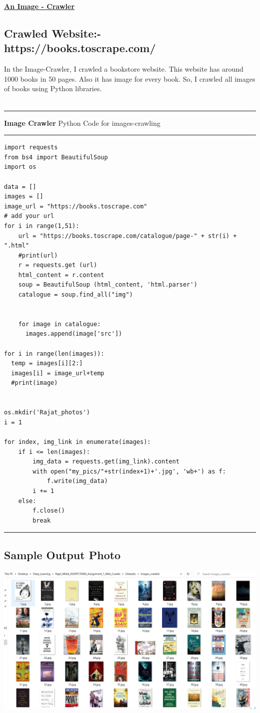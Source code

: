 \documentclass[11pt]{article}
\begin{document}
\pagebreak
\centerline{\uline{\Large{\textbf{An Image - Crawler}}}}
\subsection*{Crawled Website:- https://books.toscrape.com/}

\hspace{1in}In the Image-Crawler, I crawled a bookstore website. This website has around 1000 books in 50 pages. Also it has image for every book. So, I crawled all images of books using Python libraries.
\\

 \\
\rule{\textwidth}{0.4pt}
\textbf{Image Crawler} Python Code for images-crawling\\
\rule{\textwidth}{0.4pt}
\begin{lstlisting}
import requests
from bs4 import BeautifulSoup
import os

data = []
images = []
image_url = "https://books.toscrape.com"
# add your url
for i in range(1,51):
    url = "https://books.toscrape.com/catalogue/page-" + str(i) + ".html"
    #print(url)
    r = requests.get (url)
    html_content = r.content
    soup = BeautifulSoup (html_content, 'html.parser')
    catalogue = soup.find_all("img")
    
    
    for image in catalogue:
      images.append(image['src'])

for i in range(len(images)):
  temp = images[i][2:]
  images[i] = image_url+temp
  #print(image)


os.mkdir('Rajat_photos')
i = 1

for index, img_link in enumerate(images):
    if i <= len(images):
        img_data = requests.get(img_link).content
        with open("my_pics/"+str(index+1)+'.jpg', 'wb+') as f:
            f.write(img_data)
        i += 1
    else:
        f.close()
        break

\end{lstlisting}
\rule{\textwidth}{0.4pt}

\subsection*{Sample Output Photo}
\includegraphics[scale=0.5]{images/Images-crawled.PNG}
\pagebreak
\end{document}
